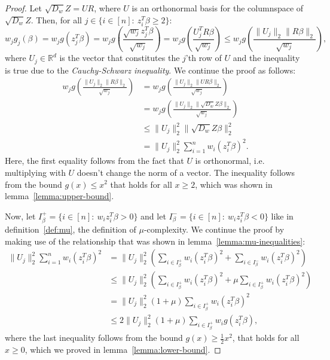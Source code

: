 \begin{proof}
    Let $\sqrt{D_w} Z = UR$, where $U$ is an orthonormal basis for the columnspace
    of $\sqrt{D_w} Z$. Then, for all $j \in \{i \in [n]:\ z_i^T \beta \geq 2 \}$:
    \begin{equation*}
        w_jg_j(\beta) = w_j g(z_j^T \beta)
        = w_j g\left(\frac{\sqrt{w_j} z_j^T \beta}{\sqrt{w_j}}\right)
        = w_j g\left(\frac{U_j^T R \beta}{\sqrt{w_j}}\right)
        \leq w_j g\left(\frac{\lVert U_j \rVert_2 \lVert R \beta \rVert_2}{\sqrt{w_j}}\right),
    \end{equation*}
    where $U_j \in \mathbb{R}^d$ is the vector that constitutes the $j$'th
    row of $U$ and the inequality is true due to the
    \textit{Cauchy-Schwarz inequality}. We continue the proof as follows:
    \begin{align*}
        w_j g\left(\frac{\lVert U_j \rVert_2 \lVert R \beta \rVert_2}{\sqrt{w_j}}\right)
         & = w_j g\left(\frac{\lVert U_j \rVert_2 \lVert U R \beta \rVert_2}{\sqrt{w_j}}\right)          \\
         & = w_j g\left(\frac{\lVert U_j \rVert_2 \lVert \sqrt{D_w} Z \beta \rVert_2}{\sqrt{w_j}}\right) \\
         & \leq \lVert U_j \rVert_2^2 \lVert \sqrt{D_w} Z \beta \rVert_2^2                               \\
         & = \lVert U_j \rVert_2^2 \sum_{i=1}^n w_i (z_i^T \beta)^2.
    \end{align*}
    Here, the first equality follows from the fact that $U$ is orthonormal, i.e.
    multiplying with $U$ doesn't change the norm of a vector.
    The inequality follows from the bound $g(x) \leq x^2$ that holds for
    all $x \geq 2$, which was shown in lemma~\ref{lemma:upper-bound}.

    Now, let $I_\beta^+ = \{i \in [n]:\ w_i z_i^T \beta > 0 \}$
    and let $I_\beta^- = \{i \in [n]:\ w_i z_i^T \beta < 0 \}$ like in
    definition~\ref{def:mu}, the definition of $\mu$-complexity.
    We continue the proof by making use of the relationship that
    was shown in lemma~\ref{lemma:mu-inequalities}:
    \begin{align*}
        \lVert U_j \rVert_2^2 \sum_{i=1}^n w_i (z_i^T \beta)^2
         & = \lVert U_j \rVert_2^2 \left( \sum_{i \in I_\beta^+} w_i (z_i^T \beta)^2 + \sum_{i \in I_\beta^-} w_i (z_i^T \beta)^2 \right)        \\
         & \leq \lVert U_j \rVert_2^2 \left( \sum_{i \in I_\beta^+} w_i (z_i^T \beta)^2 + \mu \sum_{i \in I_\beta^+} w_i (z_i^T \beta)^2 \right) \\
         & = \lVert U_j \rVert_2^2 (1 + \mu) \sum_{i \in I_\beta^+} w_i (z_i^T \beta)^2                                                          \\
         & \leq 2 \lVert U_j \rVert_2^2 (1 + \mu) \sum_{i \in I_\beta^+} w_i g(z_i^T \beta),
    \end{align*}
    where the last inequality follows from the bound
    $g(x) \geq \frac{1}{2}x^2$, that holds for all $x \geq 0$,
    which we proved in lemma~\ref{lemma:lower-bound}.


\end{proof}
